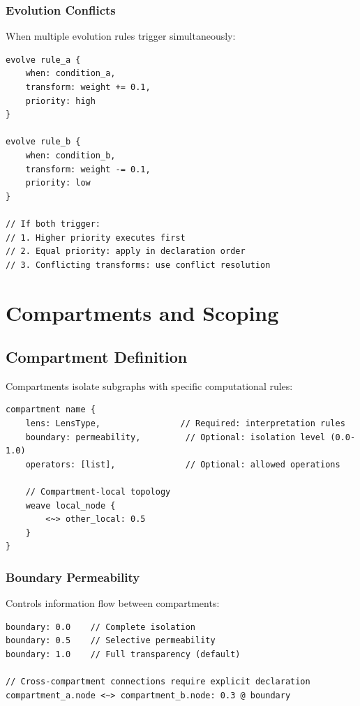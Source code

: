 \documentclass[12pt,a4paper,openany]{book} %
\begin{document}
\subsubsection{Evolution Conflicts}

When multiple evolution rules trigger simultaneously:

\vspace{0.5em}
\begin{lstlisting}[language=loom]
evolve rule_a {
    when: condition_a,
    transform: weight += 0.1,
    priority: high
}

evolve rule_b {
    when: condition_b,
    transform: weight -= 0.1,
    priority: low
}

// If both trigger:
// 1. Higher priority executes first
// 2. Equal priority: apply in declaration order
// 3. Conflicting transforms: use conflict resolution
\end{lstlisting}
\vspace{0.5em}

\section{Compartments and Scoping}

\subsection{Compartment Definition}

Compartments isolate subgraphs with specific computational rules:

\vspace{0.5em}
\begin{lstlisting}[language=loom]
compartment name {
    lens: LensType,                // Required: interpretation rules
    boundary: permeability,         // Optional: isolation level (0.0-1.0)
    operators: [list],              // Optional: allowed operations

    // Compartment-local topology
    weave local_node {
        <~> other_local: 0.5
    }
}
\end{lstlisting}
\vspace{0.5em}

\subsubsection{Boundary Permeability}

Controls information flow between compartments:

\vspace{0.5em}
\begin{lstlisting}[language=loom]
boundary: 0.0    // Complete isolation
boundary: 0.5    // Selective permeability
boundary: 1.0    // Full transparency (default)

// Cross-compartment connections require explicit declaration
compartment_a.node <~> compartment_b.node: 0.3 @ boundary
\end{lstlisting}
\vspace{0.5em}
\end{document}
